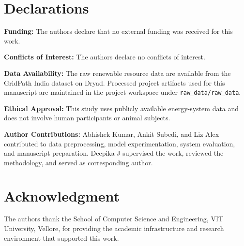 \documentclass[journal]{IEEEtran}
\begin{document}
\section*{Declarations}
\textbf{Funding:} The authors declare that no external funding was received for this work.

\textbf{Conflicts of Interest:} The authors declare no conflicts of interest.

\textbf{Data Availability:} The raw renewable resource data are available from the GridPath India dataset on Dryad. Processed project artifacts used for this manuscript are maintained in the project workspace under \texttt{raw\_data/raw\_data}.

\textbf{Ethical Approval:} This study uses publicly available energy-system data and does not involve human participants or animal subjects.

\textbf{Author Contributions:} Abhishek Kumar, Ankit Subedi, and Liz Alex contributed to data preprocessing, model experimentation, system evaluation, and manuscript preparation. Deepika J supervised the work, reviewed the methodology, and served as corresponding author.

\section*{Acknowledgment}
The authors thank the School of Computer Science and Engineering, VIT University, Vellore, for providing the academic infrastructure and research environment that supported this work.
\end{document}
